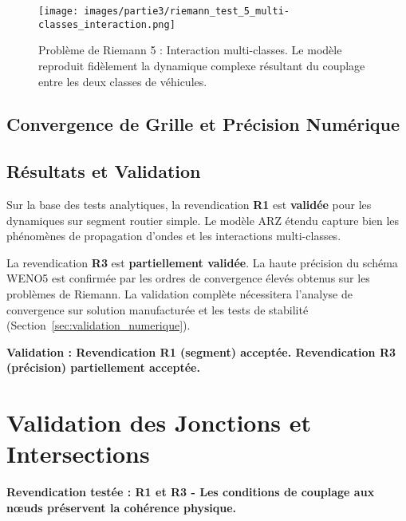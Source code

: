 \begin{figure}[htbp]
    \centering
    \texttt{[image: images/partie3/riemann\_test\_5\_multi-classes\_interaction.png]}
    \caption{Problème de Riemann 5 : Interaction multi-classes. Le modèle reproduit fidèlement la dynamique complexe résultant du couplage entre les deux classes de véhicules.}
    \label{fig:riemann_interaction_multiclasse}
\end{figure}


\subsection{Convergence de Grille et Précision Numérique}
\label{subsec:convergence_grille}

\subsection{Résultats et Validation}
\label{subsec:resultats_segment}

Sur la base des tests analytiques, la revendication \textbf{R1} est \textbf{validée} pour les dynamiques sur segment routier simple. Le modèle ARZ étendu capture bien les phénomènes de propagation d'ondes et les interactions multi-classes.

La revendication \textbf{R3} est \textbf{partiellement validée}. La haute précision du schéma WENO5 est confirmée par les ordres de convergence élevés obtenus sur les problèmes de Riemann. La validation complète nécessitera l'analyse de convergence sur solution manufacturée et les tests de stabilité (Section~\ref{sec:validation_numerique}).

\textbf{Validation : Revendication R1 (segment) acceptée. Revendication R3 (précision) partiellement acceptée.}

\section{Validation des Jonctions et Intersections}
\label{sec:validation_jonctions}

\textbf{Revendication testée : R1 et R3 - Les conditions de couplage aux nœuds préservent la cohérence physique.}

